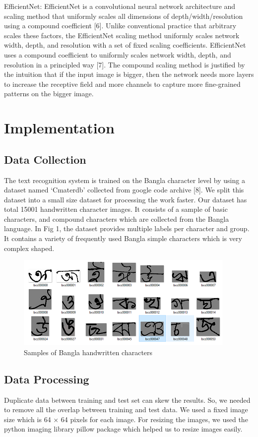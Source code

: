 \documentclass{article}
\begin{document}
                          
EfficientNet: EfficientNet is a convolutional neural network architecture and scaling method that uniformly scales all dimensions of depth/width/resolution using a compound coefficient  [6]. Unlike conventional practice that arbitrary scales these factors, the EfficientNet scaling method uniformly scales network width, depth, and resolution with a set of fixed scaling coefficients. EfficientNet uses a compound coefficient to uniformly scales network width, depth, and resolution in a principled way [7].
The compound scaling method is justified by the intuition that if the input image is bigger, then the network needs more layers to increase the receptive field and more channels to capture more fine-grained patterns on the bigger image.



\section{Implementation}

\subsection{Data Collection}
The text recognition system is trained on the Bangla character level by using a dataset named ‘Cmaterdb’ collected from google code archive [8]. We split this dataset into a small size dataset for processing the work faster. Our dataset has total 15001 handwritten character images. It consists of a sample of basic characters, and compound characters which are collected from the Bangla language. In Fig 1, the dataset provides multiple labels per character and group. It contains a variety of frequently used Bangla simple characters which is very complex shaped. 

\begin{figure}
\centering
\includegraphics{image2.png}
\caption{Samples of Bangla handwritten characters}
\end{figure}
\subsection{Data Processing}
Duplicate data between training and test set can skew the results. So, we needed to remove all the overlap between training and test data. We used a fixed image size which is 64 × 64 pixels for each image. For resizing the images, we used the python imaging library pillow package which helped us to resize images easily.
\end{document}
